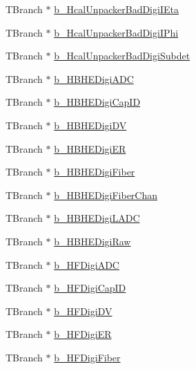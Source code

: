 \begin{DoxyCompactItemize}
T\+Branch $\ast$ \hyperlink{class_hcal_tuple_tree_a8d428324f6502ceb9e9e1178e648311f}{b\+\_\+\+Hcal\+Unpacker\+Bad\+Digi\+I\+Eta}
\item 
T\+Branch $\ast$ \hyperlink{class_hcal_tuple_tree_aaf07c9ed061f545aefe71bf2caffede0}{b\+\_\+\+Hcal\+Unpacker\+Bad\+Digi\+I\+Phi}
\item 
T\+Branch $\ast$ \hyperlink{class_hcal_tuple_tree_a23686b1f311fd4eb95a71ca3dc7b6446}{b\+\_\+\+Hcal\+Unpacker\+Bad\+Digi\+Subdet}
\item 
T\+Branch $\ast$ \hyperlink{class_hcal_tuple_tree_a4e35c984d9da2afb3c7b0931e8197fb6}{b\+\_\+\+H\+B\+H\+E\+Digi\+A\+D\+C}
\item 
T\+Branch $\ast$ \hyperlink{class_hcal_tuple_tree_a41fcdaa7b66f5c91a50c2d1fa3092110}{b\+\_\+\+H\+B\+H\+E\+Digi\+Cap\+I\+D}
\item 
T\+Branch $\ast$ \hyperlink{class_hcal_tuple_tree_a0947cb59c0a285f2d10bc40ebbb29294}{b\+\_\+\+H\+B\+H\+E\+Digi\+D\+V}
\item 
T\+Branch $\ast$ \hyperlink{class_hcal_tuple_tree_a5fba315446794d9c897db9be7ac1505e}{b\+\_\+\+H\+B\+H\+E\+Digi\+E\+R}
\item 
T\+Branch $\ast$ \hyperlink{class_hcal_tuple_tree_a9ee339ced6939a693a1323e24389a8b3}{b\+\_\+\+H\+B\+H\+E\+Digi\+Fiber}
\item 
T\+Branch $\ast$ \hyperlink{class_hcal_tuple_tree_aca05db160fd7f79deb82957d9bfd5f91}{b\+\_\+\+H\+B\+H\+E\+Digi\+Fiber\+Chan}
\item 
T\+Branch $\ast$ \hyperlink{class_hcal_tuple_tree_a00fc378c85700d30e32a89282f562117}{b\+\_\+\+H\+B\+H\+E\+Digi\+L\+A\+D\+C}
\item 
T\+Branch $\ast$ \hyperlink{class_hcal_tuple_tree_a46080fc785795af416b74b32647f49cb}{b\+\_\+\+H\+B\+H\+E\+Digi\+Raw}
\item 
T\+Branch $\ast$ \hyperlink{class_hcal_tuple_tree_a144fa5ce350665dbdb0533659d986a8c}{b\+\_\+\+H\+F\+Digi\+A\+D\+C}
\item 
T\+Branch $\ast$ \hyperlink{class_hcal_tuple_tree_a1f5322299c4c92c89806c472b30351f5}{b\+\_\+\+H\+F\+Digi\+Cap\+I\+D}
\item 
T\+Branch $\ast$ \hyperlink{class_hcal_tuple_tree_ad092ad332ed4dee55d581ce3432844d8}{b\+\_\+\+H\+F\+Digi\+D\+V}
\item 
T\+Branch $\ast$ \hyperlink{class_hcal_tuple_tree_a291fa9ec1c74b753bee69ec5eca9fe52}{b\+\_\+\+H\+F\+Digi\+E\+R}
\item 
T\+Branch $\ast$ \hyperlink{class_hcal_tuple_tree_a532aa2f5870fc18b9395b55b8841e672}{b\+\_\+\+H\+F\+Digi\+Fiber}

\end{DoxyCompactItemize}
